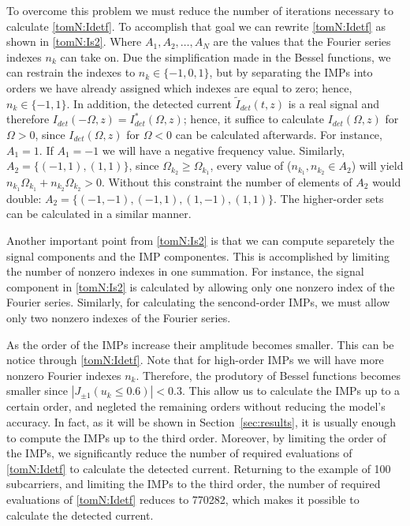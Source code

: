 \documentclass[journal]{IEEEtran}
\begin{document}
To overcome this problem we must reduce the number of iterations necessary to calculate \eqref{tomN:Idetf}. To accomplish that goal we can rewrite \eqref{tomN:Idetf} as shown in \eqref{tomN:Is2}. Where $A_1, A_2,\ldots, A_N$ are the values that the Fourier series indexes $n_k$ can take on. Due the simplification made in the Bessel functions, we can restrain the indexes to $n_k\in\{-1,0,1\}$, but by separating the IMPs into orders we have already assigned which indexes are equal to zero; hence, $n_k\in\{-1,1\}$. In addition, the detected current $\tilde{I}_{det}(t,z)$ is a real signal and therefore $I_{det}(-\Omega,z) = I_{det}^*(\Omega,z)$; hence, it suffice to calculate $I_{det}(\Omega,z)$ for $\Omega > 0$, since $I_{det}(\Omega,z)$ for $\Omega < 0$ can be calculated afterwards. For instance, $A_1 = 1$. If $A_1 = -1$ we will have a negative frequency value. Similarly, $A_2 = \{(-1, 1), (1, 1)\}$, since $\Omega_{k_2} \geq \Omega_{k_1}$, every value of ($n_{k_1}, n_{k_2} \in A_2$) will yield $n_{k_1}\Omega_{k_1}+n_{k_2}\Omega_{k_2} > 0$. Without this constraint the number of elements of $A_2$ would double: $A_2 = \{(-1, -1), (-1, 1), (1, -1), (1, 1)\}$. The higher-order sets can be calculated in a similar manner.

Another important point from \eqref{tomN:Is2} is that we can compute separetely the signal components and the IMP componentes. This is accomplished by limiting the number of nonzero indexes in one summation. For instance, the signal component in \eqref{tomN:Is2} is calculated by allowing only one nonzero index of the Fourier series. Similarly, for calculating the sencond-order IMPs, we must allow only two nonzero indexes of the Fourier series. 

As the order of the IMPs increase their amplitude becomes smaller. This can be notice through \eqref{tomN:Idetf}. Note that for high-order IMPs we will have more nonzero Fourier indexes $n_k$. Therefore, the produtory of Bessel functions becomes smaller since $|J_{\pm 1}(u_k \leq 0.6)| < 0.3$. This allow us to calculate the IMPs up to a certain order, and negleted the remaining orders without reducing the model's accuracy. In fact, as it will be shown in Section~\ref{sec:results}, it is usually enough to compute the IMPs up to the third order. Moreover, by limiting the order of the IMPs, we significantly reduce the number of required evaluations of \eqref{tomN:Idetf} to calculate the detected current. Returning to the example of 100 subcarriers, and limiting the IMPs to the third order, the number of required evaluations of \eqref{tomN:Idetf} reduces to 770282, which makes it possible to calculate the detected current.
\end{document}
